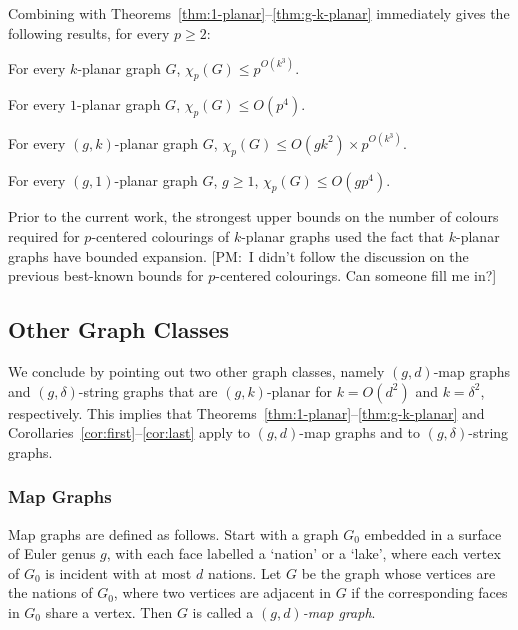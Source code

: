 \documentclass{patmorin}
\newcommand{\note}[2]{{\color{red}[#1:~#2]}}
\begin{document}
Combining  with Theorems~\ref{thm:1-planar}--\ref{thm:g-k-planar} immediately gives the following results, for every $p\ge 2$:

\begin{cor}
  For every $k$-planar graph $G$, $\chi_p(G)\le p^{O(k^3)}$.
\end{cor}

\begin{cor}
  For every $1$-planar graph $G$, $\chi_p(G)\le O(p^4)$. 
\end{cor}

\begin{cor}
  For every $(g,k)$-planar graph $G$, $\chi_p(G)\le O(gk^2)\times p^{O(k^3)}$. 
\end{cor}

\begin{cor}
  For every $(g,1)$-planar graph $G$, $g\ge 1$, $\chi_p(G)\le O(gp^4)$.
\end{cor}

Prior to the current work, the strongest upper bounds on the number of colours required for $p$-centered colourings of $k$-planar graphs used the fact that $k$-planar graphs have bounded expansion.  \note{PM}{I didn't follow the discussion on the previous best-known bounds for $p$-centered colourings.  Can someone fill me in?}

\subsection{Other Graph Classes}

We conclude by pointing out two other graph classes, namely $(g,d)$-map graphs and $(g,\delta)$-string graphs that are $(g,k)$-planar for $k=O(d^2)$ and $k=\delta^2$, respectively.  This implies that Theorems~\ref{thm:1-planar}--\ref{thm:g-k-planar} and Corollaries~\ref{cor:first}--\ref{cor:last} apply to $(g,d)$-map graphs and to $(g,\delta)$-string graphs.


\subsubsection{Map Graphs}

Map graphs are defined as follows. Start with a graph $G_0$ embedded in a surface of Euler genus $g$, with each face labelled a `nation' or a `lake', where each vertex of $G_0$ is incident with at most $d$ nations. Let $G$ be the graph whose vertices are the nations of $G_0$, where two vertices are adjacent in $G$ if the corresponding faces in $G_0$ share a vertex. Then $G$ is called a \emph{$(g,d)$-map graph}. 
\end{document}
